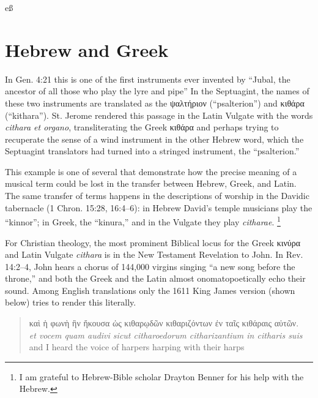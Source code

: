 \documentclass[11pt]{article}
\begin{document}
eß

\section{%
Hebrew and Greek
}

In Gen. 4:21 this is one of the first instruments ever invented by ``Jubal, the ancestor of all those who play the lyre and pipe'' 
In the Septuagint, the names of these two instruments are translated as the \textgreek{ψαλτήριον} (``psalterion'') and \textgreek{κιθάρα} (``kithara'').
St. Jerome rendered this passage in the Latin Vulgate with the words \emph{cithara et organo}, transliterating the Greek \textgreek{κιθάρα} and perhaps trying to recuperate the sense of a wind instrument in the other Hebrew word, which the Septuagint translators had turned into a stringed instrument, the ``psalterion.''

This example is one of several that demonstrate how the precise meaning of a musical term could be lost in the transfer between Hebrew, Greek, and Latin.
The same transfer of terms happens in the descriptions of worship in the Davidic tabernacle (1 Chron. 15:28, 16:4--6): in Hebrew David's temple musicians play the ``kinnor''; in Greek, the ``kinura,'' and in the Vulgate they play \emph{citharae}.%
\footnote{%
I am grateful to Hebrew-Bible scholar Drayton Benner for his help with the Hebrew. 
}
%

For Christian theology, the most prominent Biblical locus for the Greek \textgreek{κινύρα} and Latin Vulgate \emph{cithara} is in the New Testament Revelation to John.
In Rev. 14:2--4, John hears a chorus of 144,000 virgins singing ``a new song before the throne,'' and both the Greek and the Latin almost onomatopoetically echo their sound.
Among English translations only the 1611 King James version (shown below) tries to render this literally.

\begin{quote}
%
\textgreek{καὶ ἡ φωνὴ ἣν ἤκουσα ὡς κιθαρῳδῶν κιθαριζόντων ἐν ταῖς κιθάραις αὐτῶν.}\\
%
\emph{et vocem quam audivi sicut citharoedorum citharizantium in citharis suis}\\
%
and I heard the voice of harpers harping with their harps
%
\end{quote}
\end{document}
